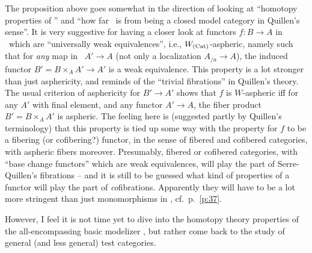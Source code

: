 The proposition above goes somewhat in the direction of looking at
``homotopy properties of \Cat'' and ``how far \Cat\ is from being a
closed model category in Quillen's sense''. It is very suggestive
for having a closer look at functors $f: B \to A$ in
\Cat\ which are ``universally weak equivalences'', i.e.,
$W_{(\mathrm{Cat})}$-aspheric, namely such that for \emph{any} map in \Cat\ $A'\to
A$ (not only a localization $A_{/a}\to A$), the induced functor
$B'=B\times_A A' \to A'$ is a weak equivalence. This property is a lot
stronger than just asphericity, and reminds of the ``trivial
fibrations'' in Quillen's theory. The usual criterion of asphericity
for $B'\to A'$ shows that $f$ is $W$-aspheric if{f} for any $A'$ with
final element, and any functor $A'\to A$, the fiber product
$B'=B\times_A A'$ is aspheric. The feeling here is (suggested partly
by Quillen's terminology) that this property is tied up some way with
the property for $f$ to be a fibering (or cofibering?) functor, in the
sense of fibered and cofibered categories, with aspheric fibers
moreover. Presumably, fibered or cofibered categories, with ``base
change functors'' which are weak equivalences, will play the part of
Serre-Quillen's fibrations -- and it is still to be guessed what kind
of properties of a functor will play the part of
\emph{co}fibrations. Apparently they will have to be a lot more
stringent than just monomorphisms in \Cat, cf.\ p.~\ref{p:37}.

However, I feel it is not time yet to dive into the homotopy theory
properties of the all-encompassing basic modelizer \Cat, but rather
come back to the study of general (and less general) test categories.

